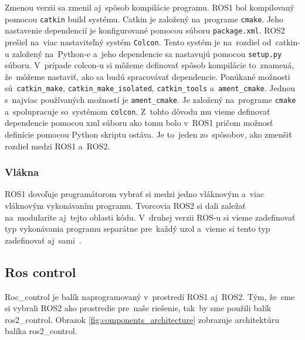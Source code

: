 	Zmenou verzii sa zmenil aj~spôsob kompilácie programu. ROS1 bol kompilovaný pomocou \texttt{catkin} build systému. Catkin je založený
	na~programe \texttt{cmake}. Jeho nastavenie dependencií je konfigurované pomocou súboru \texttt{package.xml}. ROS2 prešiel na~viac
	nastaviteľný systém \texttt{Colcon}. Tento systém je na~rozdiel od~catkin-u založený na~Python-e a~jeho dependencie sa nastavujú pomocou
	\texttt{setup.py} súboru. V~prípade colcon-u si môžeme definovať spôsob kompilácie to~znamená, že~môžeme nastaviť, ako sa budú spracovávať
	dependencie. Ponúkané možnosti sú~\texttt{catkin\_make}, \texttt{catkin\_make\_isolated}, \texttt{catkin\_tools} a~\texttt{ament\_cmake}.
	Jednou s~najviac používaných možností je \texttt{ament\_cmake}. Je založený na~programe \texttt{cmake} a~spolupracuje so~systémom \texttt{colcon}.
	Z~tohto dôvodu mu vieme definovať dependencie pomocou xml súboru ako tomu bolo v~ROS1 pričom možnosť definície pomocou Python skriptu ostáva.
	Je to~jeden zo~spôsobov, ako zmenšiť rozdiel medzi ROS1 a~ROS2.

\subsubsection{Vlákna}

	ROS1 dovoľuje programátorom vybrať si medzi jedno vláknovým a~viac vláknovým vykonávaním programu. Tvorcovia ROS2 si dali zaležať na~modularite
	aj~tejto oblasti kódu. V~druhej verzii ROS-u si vieme zadefinovať typ vykonávania programu separátne pre~každý uzol a~vieme si tento typ
	zadefinovať aj~sami~\cite{ROS2design}.

\subsection{Ros control}
\label{subsec:roscontrol}

Roc\_control je balík naprogramovaný v~prostredí ROS1 aj~ROS2. Tým, že~sme si vybrali ROS2 ako prostredie pre~naše riešenie,
tak~by sme použili balík ros2\_control. Obrazok \ref{fig:components_architecture} zobrazuje architektúru balíka ros2\_control.

